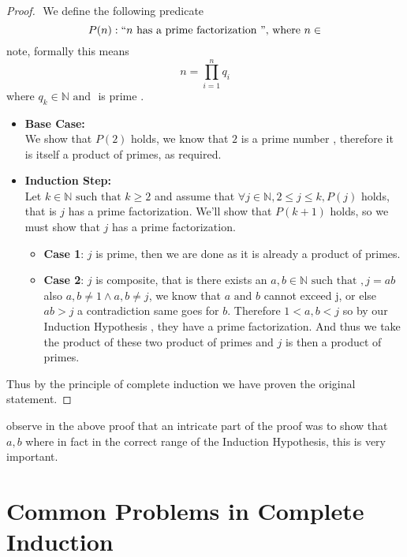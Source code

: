 \documentclass[11pt]{book}
\begin{document}
\begin{proof}
    $ $\newline
    We define the following predicate
    \[
    P(n): `` n \text{ has a prime factorization  }  "\text{, where } n \in 
    \]
    note, formally this means
    \[
    n = \prod_{i=1}^{n} q_{i}  
    \]
    where $q_{k} \in \mathbb{N} \text{ and } $ is prime .
    \begin{itemize}
        \item \textbf{Base Case:}\\
            We show that $P(2)$ holds, we know that $2$ is a prime number , therefore it is itself a product of primes, as required.
            
        \item \textbf{Induction Step:}\\
            Let $k \in \mathbb{N} \text{ such that } k\ge 2$ and assume that $\forall j \in \mathbb{N} , 2 \le j \le k, P\left(j\right) $ holds, that is $j$ has a prime factorization.
            We'll show that $P(k + 1)$ holds, so we must show that $j$ has  a prime factorization.
            \begin{itemize}
                \item \textbf{Case 1}: $j$ is prime, then we are done as it is already a product of primes.
                \item \textbf{Case 2}: $j$ is composite, that is there exists an $a, b \in \mathbb{N} \text{ such that }, j= ab $ also $  a, b \neq 1 \land a, b \neq j $, we know that $a \text{ and } b$ cannot exceed j, or else $ab > j$ a contradiction same goes for $b$. Therefore $1 < a,b < j$ so by our Induction Hypothesis , they have a prime factorization. And thus we take the product of these two product of primes and $j$ is then a product of primes.
            \end{itemize}
    \end{itemize}
    Thus by the principle of complete induction we have proven the original statement.
\end{proof}

\begin{note}
observe in the above proof that an intricate part of the proof was to show that $a, b$ where in fact in the correct range of the Induction Hypothesis, this is very important.
\end{note}


\section{Common Problems in Complete Induction}%
\label{sec:common_problems_in_complete_induction}
\end{document}
